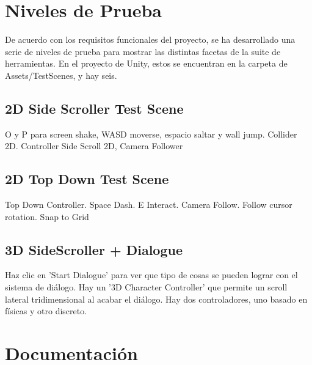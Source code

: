 \section{Niveles de Prueba}
De acuerdo con los requisitos funcionales del proyecto, se ha desarrollado una serie de niveles de prueba para mostrar las distintas facetas de la suite de herramientas. En el proyecto de Unity, estos se encuentran
en la carpeta de Assets/TestScenes, y hay seis.

\subsection{2D Side Scroller Test Scene}
O y P para screen shake, WASD moverse, espacio saltar y wall jump. Collider 2D. Controller Side Scroll 2D, Camera Follower

\subsection{2D Top Down Test Scene}
Top Down Controller. Space Dash. E Interact. Camera Follow. Follow cursor rotation. Snap to Grid

\subsection{3D SideScroller + Dialogue}
Haz clic en 'Start Dialogue' para ver que tipo de cosas se pueden lograr con el sistema de diálogo. Hay un '3D Character Controller' que permite un scroll lateral tridimensional al acabar el diálogo. Hay 
dos controladores, uno basado en físicas y otro discreto.

\section{Documentación}
